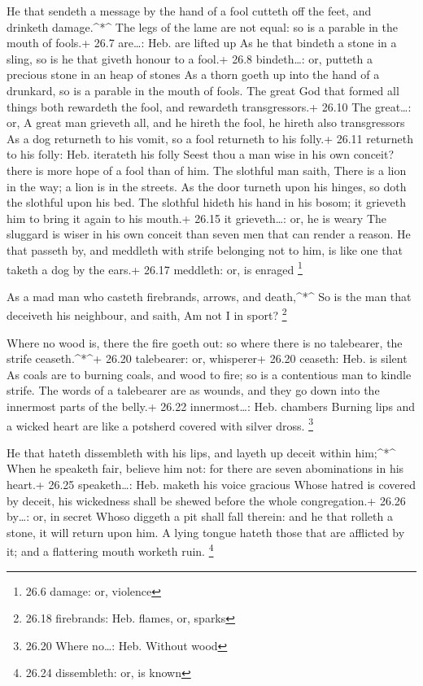  He that sendeth a message by the hand of a fool cutteth off
the feet, and drinketh damage.\^{}*\^{}  The legs of the
lame are not equal: so is a parable in the mouth of fools.+ 26.7
are\ldots: Heb. are lifted up  As he that bindeth a stone in
a sling, so is he that giveth honour to a fool.+ 26.8 bindeth\ldots: or,
putteth a precious stone in an heap of stones  As a thorn
goeth up into the hand of a drunkard, so is a parable in the mouth of
fools.  The great God that formed all things both rewardeth
the fool, and rewardeth transgressors.+ 26.10 The great\ldots: or, A
great man grieveth all, and he hireth the fool, he hireth also
transgressors  As a dog returneth to his vomit, so a fool
returneth to his folly.+ 26.11 returneth to his folly: Heb. iterateth
his folly  Seest thou a man wise in his own conceit? there
is more hope of a fool than of him.  The slothful man
saith, There is a lion in the way; a lion is in the streets.
 As the door turneth upon his hinges, so doth the slothful
upon his bed.  The slothful hideth his hand in his bosom;
it grieveth him to bring it again to his mouth.+ 26.15 it
grieveth\ldots: or, he is weary  The sluggard is wiser in
his own conceit than seven men that can render a reason. 
He that passeth by, and meddleth with strife belonging not to him, is
like one that taketh a dog by the ears.+ 26.17 meddleth: or, is enraged
\footnote{26.6 damage: or, violence}

 As a mad man who casteth firebrands, arrows, and
death,\^{}*\^{}  So is the man that deceiveth his
neighbour, and saith, Am not I in sport? \footnote{26.18 firebrands:
  Heb. flames, or, sparks}

 Where no wood is, there the fire goeth out: so where there
is no talebearer, the strife ceaseth.\^{}*\^{}+ 26.20 talebearer: or,
whisperer+ 26.20 ceaseth: Heb. is silent  As coals are to
burning coals, and wood to fire; so is a contentious man to kindle
strife.  The words of a talebearer are as wounds, and they
go down into the innermost parts of the belly.+ 26.22 innermost\ldots:
Heb. chambers  Burning lips and a wicked heart are like a
potsherd covered with silver dross. \footnote{26.20 Where no\ldots: Heb.
  Without wood}

 He that hateth dissembleth with his lips, and layeth up
deceit within him;\^{}*\^{}  When he speaketh fair, believe
him not: for there are seven abominations in his heart.+ 26.25
speaketh\ldots: Heb. maketh his voice gracious  Whose
hatred is covered by deceit, his wickedness shall be shewed before the
whole congregation.+ 26.26 by\ldots: or, in secret  Whoso
diggeth a pit shall fall therein: and he that rolleth a stone, it will
return upon him.  A lying tongue hateth those that are
afflicted by it; and a flattering mouth worketh ruin. \footnote{26.24
  dissembleth: or, is known}

